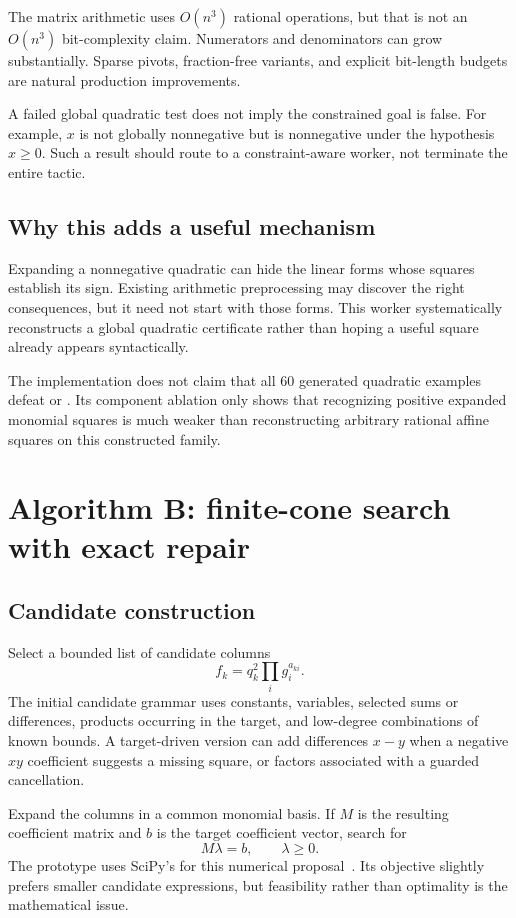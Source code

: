 The matrix arithmetic uses $O(n^3)$ rational operations, but that is not an $O(n^3)$ bit-complexity claim. Numerators and denominators can grow substantially. Sparse pivots, fraction-free variants, and explicit bit-length budgets are natural production improvements.

A failed global quadratic test does not imply the constrained goal is false. For example, $x$ is not globally nonnegative but is nonnegative under the hypothesis $x\ge0$. Such a result should route to a constraint-aware worker, not terminate the entire tactic.

\subsection{Why this adds a useful mechanism}

Expanding a nonnegative quadratic can hide the linear forms whose squares establish its sign. Existing arithmetic preprocessing may discover the right consequences, but it need not start with those forms. This worker systematically reconstructs a global quadratic certificate rather than hoping a useful square already appears syntactically.

The implementation does not claim that all 60 generated quadratic examples defeat \grind{} or . Its component ablation only shows that recognizing positive expanded monomial squares is much weaker than reconstructing arbitrary rational affine squares on this constructed family.

\section{Algorithm B: finite-cone search with exact repair}

\subsection{Candidate construction}

Select a bounded list of candidate columns
\[
 f_k=q_k^2\prod_i g_i^{a_{ki}}.
\]
The initial candidate grammar uses constants, variables, selected sums or differences, products occurring in the target, and low-degree combinations of known bounds. A target-driven version can add differences $x-y$ when a negative $xy$ coefficient suggests a missing square, or factors associated with a guarded cancellation.

Expand the columns in a common monomial basis. If $M$ is the resulting coefficient matrix and $b$ is the target coefficient vector, search for
\[
 M\lambda=b,\qquad \lambda\ge0.
\]
The prototype uses SciPy's  for this numerical proposal~\cite{scipy}. Its objective slightly prefers smaller candidate expressions, but feasibility rather than optimality is the mathematical issue.

